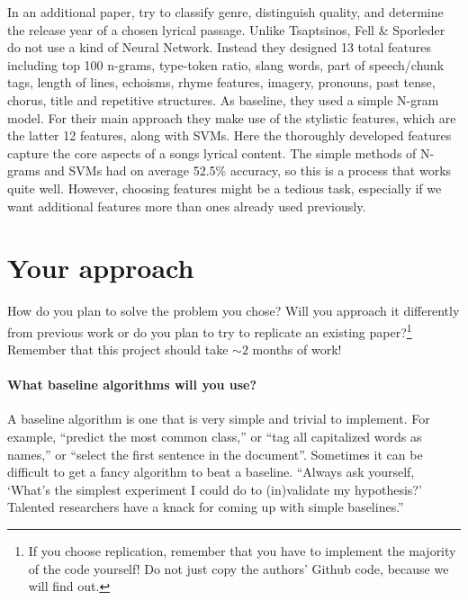 \documentclass[11pt,a4paper]{article}
\begin{document}
In an additional paper,  try to classify genre, distinguish quality, and determine the release year of a chosen lyrical passage. 
Unlike Tsaptsinos, Fell \& Sporleder do not use a kind of Neural Network. 
Instead they designed 13 total features including top 100 n-grams, type-token ratio, slang words, part of speech/chunk tags, length of lines, echoisms, rhyme features, imagery, pronouns, past tense, chorus, title and repetitive structures. 
As baseline, they used a simple N-gram model. 
For their main approach they make use of the stylistic features, which are the latter 12 features, along with SVMs. 
Here the thoroughly developed features capture the core aspects of a songs lyrical content. 
The simple methods of N-grams and SVMs had on average 52.5\% accuracy, so this is a process that works quite well. 
However, choosing features might be a tedious task, especially if we want additional features more than ones already used previously. 

\section{Your approach}
How do you plan to solve the problem you chose? Will you approach it differently from previous work or do you plan to try to replicate an existing paper?\footnote{If you choose replication, remember that you have to implement the majority of the code yourself! Do not just copy the authors' Github code, because we will find out.} Remember that this project should take $\sim 2$ months of work!

\paragraph{What baseline algorithms will you use?}
A baseline algorithm is one that is very simple and trivial to implement. For example, “predict the most common class,” or “tag all capitalized words as names,” or “select the first sentence in the document”. Sometimes it can be difficult to get a fancy algorithm to beat a baseline. “Always ask yourself, ‘What’s the simplest experiment I could do to (in)validate my hypothesis?’ Talented researchers have a knack for coming up with simple baselines.”
\end{document}
